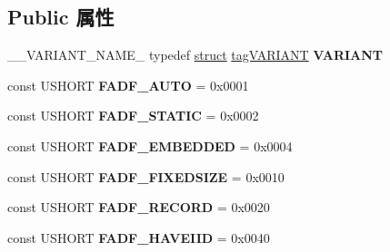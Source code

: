 \subsection*{Public 属性}
\begin{DoxyCompactItemize}
\item 
\mbox{\label{interface_i_ole_automation_types_accf43876269335dd3795162e7f3070d2}} 
\+\_\+\+\_\+\+V\+A\+R\+I\+A\+N\+T\+\_\+\+N\+A\+M\+E\+\_ typedef \hyperlink{interfacestruct}{struct} \hyperlink{struct_i_ole_automation_types_1_1tag_v_a_r_i_a_n_t}{tag\+V\+A\+R\+I\+A\+NT} {\bfseries V\+A\+R\+I\+A\+NT}
\item 
\mbox{\label{interface_i_ole_automation_types_a588c89f0f96085483555247d915b999d}} 
const U\+S\+H\+O\+RT {\bfseries F\+A\+D\+F\+\_\+\+A\+U\+TO} = 0x0001
\item 
\mbox{\label{interface_i_ole_automation_types_af25f26d4872792ae2131cf0f71240ea7}} 
const U\+S\+H\+O\+RT {\bfseries F\+A\+D\+F\+\_\+\+S\+T\+A\+T\+IC} = 0x0002
\item 
\mbox{\label{interface_i_ole_automation_types_a43edc37d58ad52f7b8055b76da10ce66}} 
const U\+S\+H\+O\+RT {\bfseries F\+A\+D\+F\+\_\+\+E\+M\+B\+E\+D\+D\+ED} = 0x0004
\item 
\mbox{\label{interface_i_ole_automation_types_aad5943ebf4d1a93d16aa854f6c0de775}} 
const U\+S\+H\+O\+RT {\bfseries F\+A\+D\+F\+\_\+\+F\+I\+X\+E\+D\+S\+I\+ZE} = 0x0010
\item 
\mbox{\label{interface_i_ole_automation_types_a9c0db33ce28a06cbde5bf318d84da6b9}} 
const U\+S\+H\+O\+RT {\bfseries F\+A\+D\+F\+\_\+\+R\+E\+C\+O\+RD} = 0x0020
\item 
\mbox{\label{interface_i_ole_automation_types_a54373309c1bfdd635033ca6f59dd3329}} 
const U\+S\+H\+O\+RT {\bfseries F\+A\+D\+F\+\_\+\+H\+A\+V\+E\+I\+ID} = 0x0040
\item 
\mbox{\label{interface_i_ole_automation_types_a2199a74f964f024ed8922cbeedda5728}} 

\end{DoxyCompactItemize}
